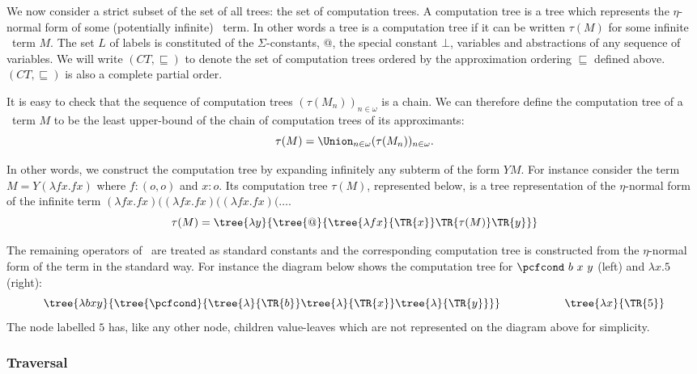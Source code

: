 We now consider a strict subset of the set of all trees: the set of computation trees.
A computation tree is a tree which represents the $\eta$-normal form of some (potentially infinite) \pcf\ term. In
other words a tree is a computation tree if it can be written $\tau(M)$ for some infinite \pcf\ term $M$.
The set $L$ of labels is constituted of the $\Sigma$-constants, @, the special constant $\bot$, variables and abstractions of any sequence of variables.
We will write $(CT, \sqsubseteq)$ to denote the set of computation trees ordered
by the approximation ordering $\sqsubseteq$ defined above.
$(CT, \sqsubseteq)$ is also a complete partial order.

It is easy to check that the sequence of computation trees
$(\tau(M_n))_{n\in\omega}$ is a chain. We can therefore define the
computation tree of a \pcf\ term $M$ to be the least upper-bound of
the chain of computation trees of its approximants:
$$\tau(M) = \Union_{n\in\omega}(\tau(M_n))_{n\in\omega}.$$

In other words, we construct the computation tree
by expanding infinitely any subterm of the form $Y M$.
For instance consider the term $M = Y (\lambda f x. f x)$ where $f:(o,o)$ and $x:o$.
Its computation tree $\tau(M)$, represented below, is a tree representation of the $\eta$-normal form of
the infinite term $(\lambda f x. f x) ((\lambda f x. f x) ((\lambda f x. f x)  ( \ldots$.
$$\tau(M) = \tree{\lambda y}{
                \tree{@}{
                   \tree{\lambda f x} {\TR{x}}
                   \TR{\tau(M)} \TR{y}
                }
            }
$$

The remaining operators of \ialgol\ are treated as standard
constants and the corresponding computation tree is constructed from
the $\eta$-normal form of the term in the standard way. For instance
the diagram below shows the computation tree for $\pcfcond\ b\ x\ y$
(left) and $\lambda x . 5$ (right):
$$
\tree{\lambda b x y}
     {  \tree{\pcfcond}
        {   \tree{\lambda} {\TR{b}}
            \tree{\lambda} {\TR{x}}
            \tree{\lambda} {\TR{y}}
        }
    }
\hspace{2cm}
\tree{\lambda x}{  \TR{5} }
$$
The node labelled $5$ has, like any other node, children value-leaves which are not represented on the diagram above for simplicity.

\subsubsection{Traversal}

